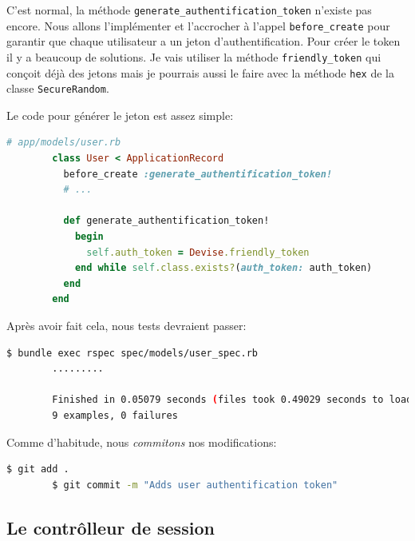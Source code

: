 \documentclass[]{report}
\begin{document}
      C'est normal, la méthode \verb|generate_authentification_token| n'existe pas encore. Nous allons l'implémenter et l'accrocher à l'appel \verb|before_create|  pour garantir que chaque utilisateur a un jeton d'authentification. Pour créer le token il y a beaucoup de solutions. Je vais utiliser la méthode \verb|friendly_token| qui conçoit déjà des jetons mais je pourrais aussi le faire avec la méthode \verb|hex| de la classe \verb|SecureRandom|.

      Le code pour générer le jeton est assez simple:

      \begin{scriptsize}
        \begin{lstlisting}[language=ruby]
        # app/models/user.rb
        class User < ApplicationRecord
          before_create :generate_authentification_token!
          # ...

          def generate_authentification_token!
            begin
              self.auth_token = Devise.friendly_token
            end while self.class.exists?(auth_token: auth_token)
          end
        end
        \end{lstlisting}
      \end{scriptsize}

      Après avoir fait cela, nous tests devraient passer:

      \begin{scriptsize}
        \begin{lstlisting}[language=bash]
        $ bundle exec rspec spec/models/user_spec.rb
        .........

        Finished in 0.05079 seconds (files took 0.49029 seconds to load)
        9 examples, 0 failures
        \end{lstlisting}
      \end{scriptsize}

      Comme d'habitude, nous \textit{commitons} nos modifications:

      \begin{scriptsize}
        \begin{lstlisting}[language=bash]
        $ git add .
        $ git commit -m "Adds user authentification token"
        \end{lstlisting}
      \end{scriptsize}

    \subsection{Le contrôlleur de session}
\end{document}
